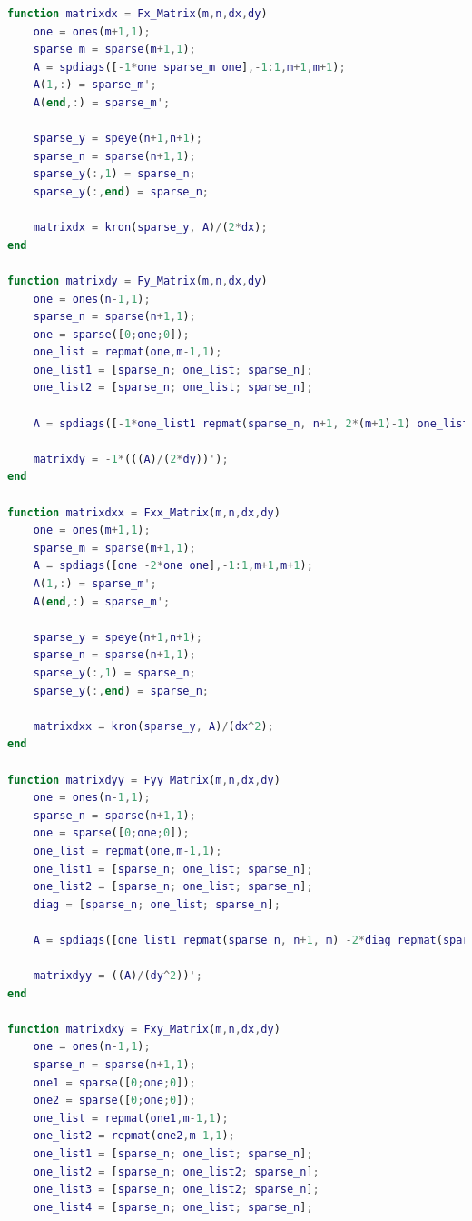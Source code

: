 \documentclass[12pt,letterpaper]{article}
\begin{document}
\begin{lstlisting}[language = Matlab]
    function matrixdx = Fx_Matrix(m,n,dx,dy)
    one = ones(m+1,1);
    sparse_m = sparse(m+1,1);
    A = spdiags([-1*one sparse_m one],-1:1,m+1,m+1);
    A(1,:) = sparse_m';
    A(end,:) = sparse_m';

    sparse_y = speye(n+1,n+1);
    sparse_n = sparse(n+1,1);
    sparse_y(:,1) = sparse_n;
    sparse_y(:,end) = sparse_n;
 
    matrixdx = kron(sparse_y, A)/(2*dx);
end

function matrixdy = Fy_Matrix(m,n,dx,dy)
    one = ones(n-1,1);
    sparse_n = sparse(n+1,1);
    one = sparse([0;one;0]);
    one_list = repmat(one,m-1,1);
    one_list1 = [sparse_n; one_list; sparse_n];
    one_list2 = [sparse_n; one_list; sparse_n];

    A = spdiags([-1*one_list1 repmat(sparse_n, n+1, 2*(m+1)-1) one_list2],-(m+1):(m+1),(m+1)*(n+1),(m+1)*(n+1));
 
    matrixdy = -1*(((A)/(2*dy))');
end

function matrixdxx = Fxx_Matrix(m,n,dx,dy)
    one = ones(m+1,1);
    sparse_m = sparse(m+1,1);
    A = spdiags([one -2*one one],-1:1,m+1,m+1);
    A(1,:) = sparse_m';
    A(end,:) = sparse_m';

    sparse_y = speye(n+1,n+1);
    sparse_n = sparse(n+1,1);
    sparse_y(:,1) = sparse_n;
    sparse_y(:,end) = sparse_n;
 
    matrixdxx = kron(sparse_y, A)/(dx^2);
end

function matrixdyy = Fyy_Matrix(m,n,dx,dy)
    one = ones(n-1,1);
    sparse_n = sparse(n+1,1);
    one = sparse([0;one;0]);
    one_list = repmat(one,m-1,1);
    one_list1 = [sparse_n; one_list; sparse_n];
    one_list2 = [sparse_n; one_list; sparse_n];
    diag = [sparse_n; one_list; sparse_n];
    
    A = spdiags([one_list1 repmat(sparse_n, n+1, m) -2*diag repmat(sparse_n, n+1, m) one_list2],-(m+1):(m+1),(m+1)*(n+1),(m+1)*(n+1));
 
    matrixdyy = ((A)/(dy^2))';
end

function matrixdxy = Fxy_Matrix(m,n,dx,dy)
    one = ones(n-1,1);
    sparse_n = sparse(n+1,1);
    one1 = sparse([0;one;0]);
    one2 = sparse([0;one;0]);
    one_list = repmat(one1,m-1,1);
    one_list2 = repmat(one2,m-1,1);
    one_list1 = [sparse_n; one_list; sparse_n];
    one_list2 = [sparse_n; one_list2; sparse_n];
    one_list3 = [sparse_n; one_list2; sparse_n];
    one_list4 = [sparse_n; one_list; sparse_n];


\end{lstlisting}
\end{document}
